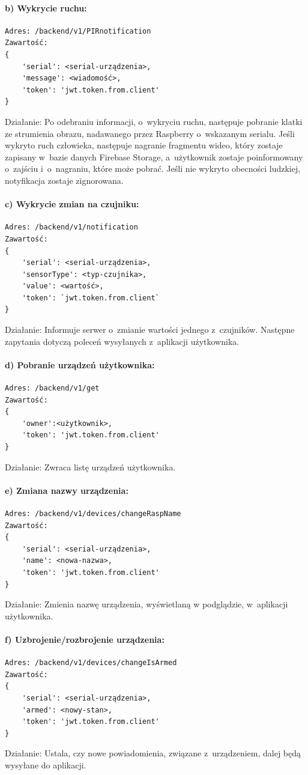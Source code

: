 \paragraph{b) Wykrycie ruchu:}
\begin{verbatim}
Adres: /backend/v1/PIRnotification
Zawartość: 
{
	'serial': <serial-urządzenia>, 
	'message': <wiadomość>, 
	'token': 'jwt.token.from.client'
}
\end{verbatim}
Działanie: Po odebraniu informacji, o~wykryciu ruchu, następuje pobranie klatki ze strumienia obrazu, nadawanego przez Raspberry o~wskazanym serialu. Jeśli wykryto ruch człowieka, następuje nagranie fragmentu wideo, który zostaje zapisany w~bazie danych Firebase Storage, a~użytkownik zostaje poinformowany o~zajściu i~o~nagraniu, które może pobrać. Jeśli nie wykryto obecności ludzkiej, notyfikacja zostaje zignorowana.

\paragraph{c) Wykrycie zmian na czujniku:}
\begin{verbatim}
Adres: /backend/v1/notification
Zawartość: 
{
	'serial': <serial-urządzenia>, 
	'sensorType': <typ-czujnika>, 
	'value': <wartość>, 
	'token': `jwt.token.from.client`
}
\end{verbatim}
Działanie: Informuje serwer o~zmianie wartości jednego z~czujników.\newline
Następne zapytania dotyczą poleceń wysyłanych z~aplikacji użytkownika.
\paragraph{d) Pobranie urządzeń użytkownika:}
\begin{verbatim}
Adres: /backend/v1/get
Zawartość: 
{
	'owner':<użytkownik>, 
	'token': 'jwt.token.from.client'
}
\end{verbatim}
Działanie: Zwraca listę urządzeń użytkownika.
\paragraph{e) Zmiana nazwy urządzenia:}
\begin{verbatim}
Adres: /backend/v1/devices/changeRaspName
Zawartość:
{
	'serial': <serial-urządzenia>, 
	'name': <nowa-nazwa>, 
	'token': 'jwt.token.from.client'
}
\end{verbatim}
Działanie: Zmienia nazwę urządzenia, wyświetlaną w podglądzie, w~aplikacji użytkownika.
\paragraph{f) Uzbrojenie/rozbrojenie urządzenia:}
\begin{verbatim}
Adres: /backend/v1/devices/changeIsArmed
Zawartość: 
{
	'serial': <serial-urządzenia>, 
	'armed': <nowy-stan>, 
	'token': 'jwt.token.from.client'
}
\end{verbatim}
Działanie: Ustala, czy nowe powiadomienia, związane z~urządzeniem, dalej będą wysyłane do aplikacji.
